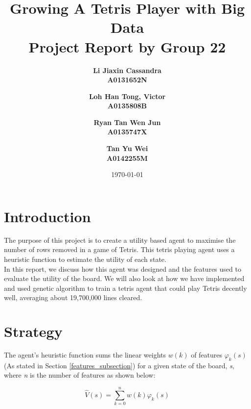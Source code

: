 \documentclass[a4paper,12pt,twocolumn]{article}
\begin{document}
\setlength{\parindent}{0pt}

\title{
    Growing A Tetris Player with Big Data\\
    \large Project Report by Group 22
}
\author{
    \bf{Li Jiaxin Cassandra}\\ 
    A0131652N
    \and
    \bf{Loh Han Tong, Victor}\\
    A0135808B
    \and
    \bf{Ryan Tan Wen Jun}\\
    A0135747X
    \and
    \bf{Tan Yu Wei}\\
    A0142255M
}
\date{\today}
\maketitle

\section{Introduction}
The purpose of this project is to create a utility based agent to maximise the
number of rows removed in a game of Tetris. This tetris playing agent uses a heuristic
function to estimate the utility of each state.\\

In this report, we discuss how this agent was designed and the features used to
evaluate the utility of the board. We will also look at how we have implemented
and used genetic algorithm to train a tetris agent that could play Tetris decently well,
averaging about 19,700,000 lines cleared. 

\section{Strategy}
The agent's heuristic function sums the linear weights $w(k)$ of features $\varphi_k(s)$
(As stated in Section \ref{features_subsection}) for a given state of the board,
\textit{s}, where \textit{n} is the number of features as shown below:

\[
    \hat V(s) = \sum_{k=0}^{n}w(k)\varphi_k(s)
\]
\end{document}

